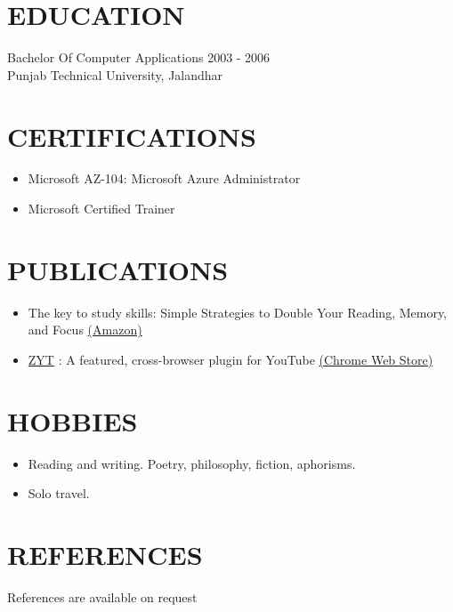 \documentclass[margin, 10pt]{res} %
\begin{document}
\begin{resume}
\section{\ttfamily EDUCATION}
Bachelor Of Computer Applications \hfill 2003 - 2006 \\
Punjab Technical University, Jalandhar 
\section{\ttfamily CERTIFICATIONS}
\begin{itemize}
\item Microsoft AZ-104: Microsoft Azure Administrator 
\item Microsoft Certified Trainer
\end{itemize}
\section{\ttfamily PUBLICATIONS}
\begin{itemize}
\item The key to study skills: Simple Strategies to Double Your Reading, Memory, and Focus \hfill \href{https://amzn.to/3myBJlJ}{(Amazon)}
\item \href{https://github.com/inversepolarity/ZYT}{ZYT} : A featured, cross-browser plugin for YouTube \hfill 
\href{https://chrome.google.com/webstore/detail/zentube/ghfgfebinnjlnbidclplakjfielgpokd}{(Chrome Web Store)}
\
\end{itemize}
\section{\ttfamily HOBBIES}
\begin{itemize}
\item Reading and writing. Poetry, philosophy, fiction, aphorisms. 
\item Solo travel.
\end{itemize}
\section{\ttfamily REFERENCES}
References are available on request


\end{resume}
\end{document}
